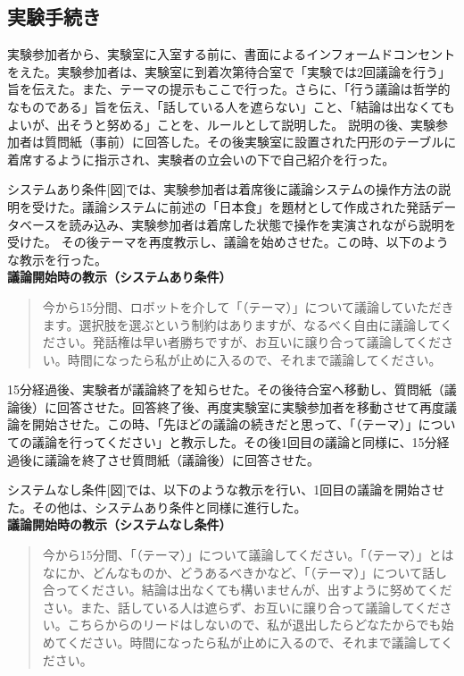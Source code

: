 \documentclass[11pt, a4paper]{jreport} %
\begin{document}
\subsection{実験手続き}
実験参加者から、実験室に入室する前に、書面によるインフォームドコンセントをえた。実験参加者は、実験室に到着次第待合室で「実験では2回議論を行う」旨を伝えた。また、テーマの提示もここで行った。さらに、「行う議論は哲学的なものである」旨を伝え、「話している人を遮らない」こと、「結論は出なくてもよいが、出そうと努める」ことを、ルールとして説明した。
説明の後、実験参加者は質問紙（事前）に回答した。その後実験室に設置された円形のテーブルに着席するように指示され、実験者の立会いの下で自己紹介を行った。


システムあり条件[図]では、実験参加者は着席後に議論システムの操作方法の説明を受けた。議論システムに前述の「日本食」を題材として作成された発話データベースを読み込み、実験参加者は着席した状態で操作を実演されながら説明を受けた。
その後テーマを再度教示し、議論を始めさせた。この時、以下のような教示を行った。\\
\textbf{議論開始時の教示（システムあり条件）}
\begin{quote}
今から15分間、ロボットを介して「（テーマ）」について議論していただきます。選択肢を選ぶという制約はありますが、なるべく自由に議論してください。発話権は早い者勝ちですが、お互いに譲り合って議論してください。時間になったら私が止めに入るので、それまで議論してください。

\end{quote}
15分経過後、実験者が議論終了を知らせた。その後待合室へ移動し、質問紙（議論後）に回答させた。回答終了後、再度実験室に実験参加者を移動させて再度議論を開始させた。この時、「先ほどの議論の続きだと思って、「（テーマ）」についての議論を行ってください」と教示した。その後1回目の議論と同様に、15分経過後に議論を終了させ質問紙（議論後）に回答させた。


システムなし条件[図]では、以下のような教示を行い、1回目の議論を開始させた。その他は、システムあり条件と同様に進行した。\\
\textbf{議論開始時の教示（システムなし条件）}
\begin{quote}
今から15分間、「（テーマ）」について議論してください。「（テーマ）」とはなにか、どんなものか、どうあるべきかなど、「（テーマ）」について話し合ってください。結論は出なくても構いませんが、出すように努めてください。また、話している人は遮らず、お互いに譲り合って議論してください。こちらからのリードはしないので、私が退出したらどなたからでも始めてください。時間になったら私が止めに入るので、それまで議論してください。
\end{quote}
\end{document}
